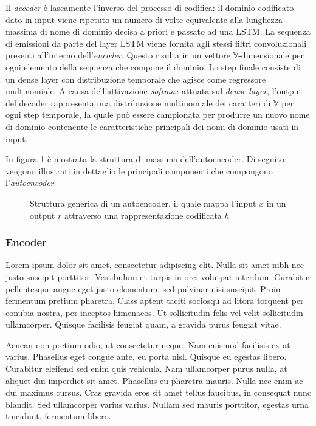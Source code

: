 Il \textit{decoder} è lascamente l'inverso del processo di codifica: il dominio codificato dato in input viene ripetuto un numero di volte equivalente alla lunghezza massima di nome di dominio decisa a priori e passato ad una LSTM. La sequenza di emissioni da parte del layer LSTM viene fornita agli stessi filtri convoluzionali presenti all'interno dell'\textit{encoder}. Questo risulta in un vettore $\mathbb{V}$-dimensionale per ogni elemento della sequenza che compone il dominio.
Lo step finale consiste di un dense layer con distribuzione temporale che agisce come regressore multinomiale. A causa dell'attivazione \textit{softmax} attuata sul \textit{dense layer}, l'output del decoder rappresenta una distribuzione multinomiale dei caratteri di $\mathbb{V}$ per ogni step temporale, la quale può essere campionata per produrre un nuovo nome di dominio contenente le caratteristiche principali dei nomi di dominio usati in input.

In figura \ref{fig:autoencoder1} è mostrata la struttura di massima dell'autoencoder. Di seguito vengono illustrati in dettaglio le principali componenti che compongono l'\textit{autoencoder}. 

\begin{figure}[p]
    \centering
	
	\caption{Struttura generica di un autoencoder, il quale mappa l'input $x$ in un output $r$ attraverso una rappresentazione codificata $h$}
\label{fig:autoencoder1}
\end{figure}

\subsubsection{Encoder}
Lorem ipsum dolor sit amet, consectetur adipiscing elit. Nulla sit amet nibh nec justo suscipit porttitor. Vestibulum et turpis in orci volutpat interdum. Curabitur pellentesque augue eget justo elementum, sed pulvinar nisi suscipit. Proin fermentum pretium pharetra. Class aptent taciti sociosqu ad litora torquent per conubia nostra, per inceptos himenaeos. Ut sollicitudin felis vel velit sollicitudin ullamcorper. Quisque facilisis feugiat quam, a gravida purus feugiat vitae.

Aenean non pretium odio, ut consectetur neque. Nam euismod facilisis ex at varius. Phasellus eget congue ante, eu porta nisl. Quisque eu egestas libero. Curabitur eleifend sed enim quis vehicula. Nam ullamcorper purus nulla, at aliquet dui imperdiet sit amet. Phasellus eu pharetra mauris. Nulla nec enim ac dui maximus cursus. Cras gravida eros sit amet tellus faucibus, in consequat nunc blandit. Sed ullamcorper varius varius. Nullam sed mauris porttitor, egestas urna tincidunt, fermentum libero.


